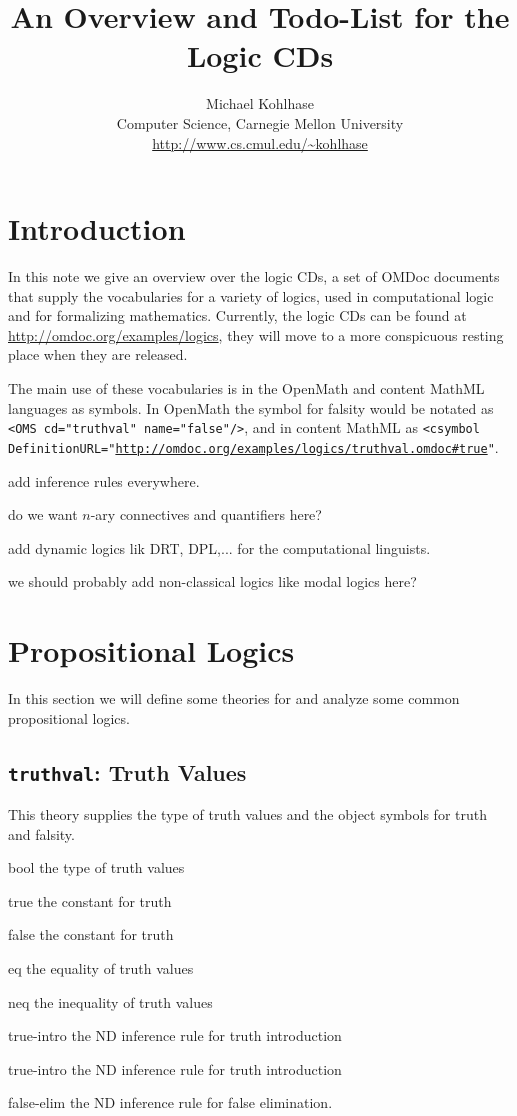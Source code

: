 \documentclass{article}
\title{An Overview and Todo-List for the Logic CDs}
\author{Michael Kohlhase\\ 
Computer Science, Carnegie Mellon University\\
\url{http://www.cs.cmul.edu/~kohlhase}}
\def\openmath{{\sc OpenMath}}
\def\omdoc{{\sc OMDoc}}
\def\mathml{{\sc MathML}}
\begin{document}
\maketitle

\section{Introduction}
In this note we give an overview over the logic CDs, a set of {\omdoc} documents that
supply the vocabularies for a variety of logics, used in computational logic and for
formalizing mathematics.  Currently, the logic CDs can be found at
{\url{http://omdoc.org/examples/logics}}, they will move to a more conspicuous resting
place when they are released.

The main use of these vocabularies is in the {\openmath} and content {\mathml}
languages as symbols. In {\openmath} the symbol for falsity would be notated as 
{\tt{<OMS cd="truthval" name="false"/>}}, and in content {\mathml} as
{\tt{<csymbol DefinitionURL="\url{http://omdoc.org/examples/logics/truthval.omdoc#true}"}}.

\begin{todolist}{}
\item add inference rules everywhere. 
\item do we want $n$-ary connectives and quantifiers here?
\item add dynamic logics lik DRT, DPL,... for the computational linguists.
\item we should probably add non-classical logics like modal logics here?
\end{todolist}

 \section{Propositional Logics}
 In this section we will define some theories for and analyze some common
 propositional logics.

\subsection{{\tt{truthval}}: Truth Values}
This theory supplies the type of truth values and the object symbols for truth and
falsity. 

\begin{constlist}
  \item[bool] the type of truth values
  \item[true] the constant for truth
  \item[false] the constant for truth
  \item[eq] the equality of truth values
  \item[neq] the inequality of truth values
  \item[true-intro] the ND inference rule for truth introduction
  \item[true-intro] the ND inference rule for truth introduction
  \item[false-elim] the ND inference rule for false elimination.
\end{constlist}
  
\end{document}
